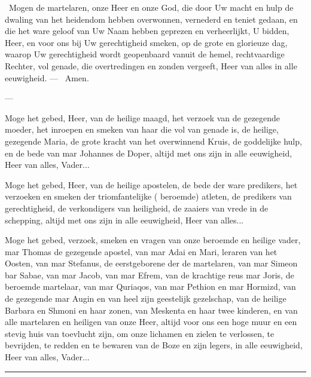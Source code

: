 \documentclass[12pt,twoside,a5paper]{article}
\begin{document}
\cc\  Mogen de martelaren, onze Heer en onze God, die door Uw macht en hulp de dwaling van het heidendom hebben overwonnen, vernederd en teniet gedaan, en die het ware geloof van Uw Naam hebben geprezen en verheerlijkt, U bidden, Heer, en voor ons bij Uw gerechtigheid smeken, op de grote en glorieuze dag, waarop Uw gerechtigheid wordt geopenbaard vanuit de hemel, rechtvaardige Rechter, vol genade, die overtredingen en zonden vergeeft, Heer van alles in alle eeuwigheid. --- \rr\ Amen.


 --- 

  Moge het gebed, Heer, van de heilige maagd, het verzoek van de gezegende moeder, het inroepen en smeken van haar die vol van genade is, de heilige, gezegende Maria, de grote kracht van het overwinnend Kruis, de goddelijke hulp, en de bede van mar Johannes de Doper, altijd met ons zijn in alle eeuwigheid, Heer van alles, Vader...

 Moge het gebed, Heer, van de heilige apostelen, de bede der ware predikers, het verzoeken en smeken der triomfantelijke ( beroemde) atleten, de predikers van gerechtigheid, de verkondigers van heiligheid, de zaaiers van vrede in de schepping, altijd met ons zijn in alle eeuwigheid, Heer van alles...

 Moge het gebed, verzoek, smeken en vragen van onze beroemde en heilige vader, mar Thomas de gezegende apostel, van mar Adai en Mari, leraren van het Oosten, van mar Stefanus, de eerstgeborene der de martelaren, van mar Simeon bar Sabae, van mar Jacob, van mar Efrem, van de krachtige reus mar Joris, de beroemde martelaar, van mar Quriaqos, van mar Pethion en mar Hormizd, van de gezegende mar Augin en van heel zijn geestelijk gezelschap, van de heilige Barbara en Shmoni en haar zonen, van Meskenta en haar twee kinderen, en van alle martelaren en heiligen van onze Heer, altijd voor ons een hoge muur en een stevig huis van toevlucht zijn, om onze lichamen en zielen te verlossen, te bevrijden, te redden en te bewaren van de Boze en zijn legers, in alle eeuwigheid, Heer van alles, Vader...

\noindent\rule{\textwidth}{0.5pt}
\end{document}
